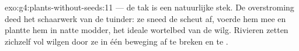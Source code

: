 \begin{solution}{exo:g4:plants-without-seeds:11}
 --- de tak is een natuurlijke stek. De
overstroming deed het schaarwerk van de tuinder: ze sneed de scheut af,
voerde hem mee en plantte hem in natte modder, het ideale wortelbed van
de wilg. Rivieren zetten zichzelf vol wilgen door ze in één beweging af
te breken en te .
\end{solution}
